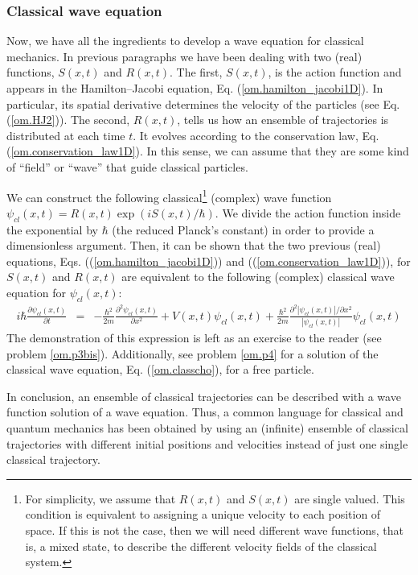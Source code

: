 \documentclass[onecolumn,nofootinbib, secnumarabic, amsmath, nobibnotes,12pt,aps,pra]{revtex4-1}
\newcommand{\pref}[1]{(\ref{#1})}
\newcommand{\eref}[1]{Eq. (\ref{#1})}
\begin{document}
\subsubsection{Classical wave equation}

Now, we have all the ingredients to develop a wave equation for classical mechanics. In previous paragraphs we have been dealing with two (real) functions, $S(x,t)$ and $R(x,t)$. The first, $S(x,t)$, is the action function and appears in the Hamilton--Jacobi equation, \eref{om.hamilton_jacobi1D}. In particular, its spatial derivative determines the velocity of the particles (see \eref{om.HJ2}). The second, $R(x,t)$, tells us how an ensemble of trajectories is distributed at each time $t$. It evolves according to the conservation law, \eref{om.conservation_law1D}. In this sense, we can assume that they are some kind of ``field'' or ``wave'' that guide classical particles.

We can construct the following classical\footnote{For simplicity, we assume that $R(x,t)$ and $S(x,t)$ are single valued. This condition is equivalent to assigning a unique velocity to each position of space. If this is not the case, then we will need different wave functions, that is, a mixed state, to describe the different velocity fields of the classical system.} (complex) wave function $\psi_{cl}(x,t) = R(x,t) \exp(i S(x,t)/\hbar)$.
We divide the action function inside the exponential by $\hbar$ (the reduced Planck's constant) in order to provide a dimensionless argument.
Then, it can be shown that the two previous (real) equations, Eqs. (\pref{om.hamilton_jacobi1D}) and (\pref{om.conservation_law1D}), for $S(x,t)$ and $R(x,t)$ are equivalent to the following (complex) classical wave equation for $\psi_{cl}(x,t)$:
\begin{eqnarray}
\label{om.classcho}
i \hbar \frac{ \partial \psi_{cl}(x,t)} {\partial t} &=& -\frac {\hbar^2}{2m} \frac{ {\partial}^2 \psi_{cl}(x,t)} {\partial x^2} + V(x,t) \psi_{cl}(x,t)+ \frac {\hbar^{2}} {2 m} \frac { {\partial}^2 |\psi_{cl}(x,t)|/ \partial x^2}{|\psi_{cl}(x,t)|} \psi_{cl}(x,t)
\end{eqnarray}
The demonstration of this expression is left as an exercise to the
reader (see problem \ref{om.p3bis}). Additionally, see problem
\ref{om.p4} for a solution of the classical wave equation,
\eref{om.classcho}, for a free particle.

In conclusion, an ensemble of classical trajectories can be described with a wave function solution of a wave equation.
Thus, a common language for classical and quantum mechanics has been obtained by using an (infinite) ensemble of classical trajectories with different initial positions and velocities instead of just one single classical trajectory.
\end{document}

